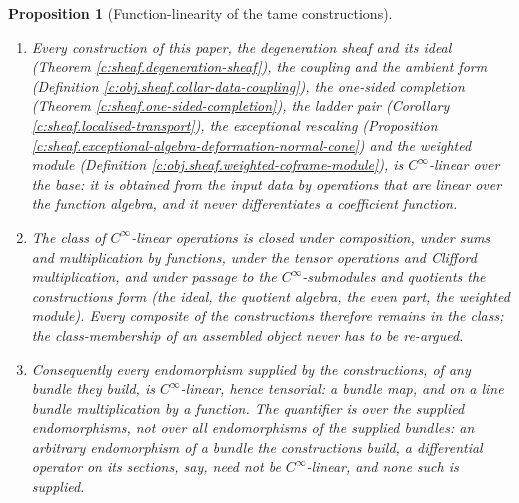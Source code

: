 \documentclass[11pt]{article}
\newtheorem{proposition}[theorem]{Proposition}
\theoremstyle{definition}
\theoremstyle{plain}
\begin{document}
\begin{proposition}[Function-linearity of the tame constructions]\label{c:sheaf.function-linearity-tame-constructions}
\leavevmode
\begin{enumerate}
\item Every construction of this paper, the degeneration sheaf and its ideal (Theorem \ref{c:sheaf.degeneration-sheaf}), the coupling and the ambient form (Definition \ref{c:obj.sheaf.collar-data-coupling}), the one-sided completion (Theorem \ref{c:sheaf.one-sided-completion}), the ladder pair (Corollary \ref{c:sheaf.localised-transport}), the exceptional rescaling (Proposition \ref{c:sheaf.exceptional-algebra-deformation-normal-cone}) and the weighted module (Definition \ref{c:obj.sheaf.weighted-coframe-module}), is $C^\infty$-linear over the base: it is obtained from the input data by operations that are linear over the function algebra, and it never differentiates a coefficient function.
\item The class of $C^\infty$-linear operations is closed under composition, under sums and multiplication by functions, under the tensor operations and Clifford multiplication, and under passage to the $C^\infty$-submodules and quotients the constructions form (the ideal, the quotient algebra, the even part, the weighted module). Every composite of the constructions therefore remains in the class; the class-membership of an assembled object never has to be re-argued.
\item Consequently every endomorphism \emph{supplied by} the constructions, of any bundle they build, is $C^\infty$-linear, hence tensorial: a bundle map, and on a line bundle multiplication by a function. The quantifier is over the supplied endomorphisms, not over all endomorphisms of the supplied bundles: an arbitrary endomorphism of a bundle the constructions build, a differential operator on its sections, say, need not be $C^\infty$-linear, and none such is supplied.
\end{enumerate}
\end{proposition}
\end{document}
